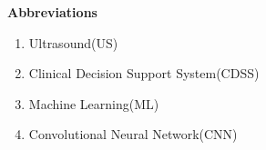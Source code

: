 \documentclass[12pt]{article}
\begin{document}
\begin{center}
    {\Large \bf Abbreviations}
\end{center}

\vspace{1em}

\begin{enumerate}
    \item Ultrasound(US)
    \item Clinical Decision Support System(CDSS)
    \item Machine Learning(ML)
    \item Convolutional Neural Network(CNN)
    
\end{enumerate}
\end{document}

